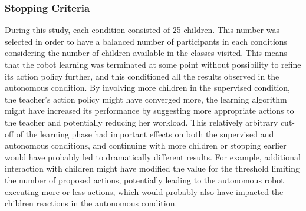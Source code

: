 
\subsubsection{Stopping Criteria}

During this study, each condition consisted of 25 children. This number was selected in order to have a balanced number of participants in each conditions considering the number of  children available in the classes visited. This means that the robot learning was terminated at some point without possibility to refine its action policy further, and this conditioned all the results observed in the autonomous condition. By involving more children in the supervised condition, the teacher's action policy might have converged more, the learning algorithm might have increased its performance by suggesting more appropriate actions to the teacher and potentially reducing her workload. This relatively arbitrary cut-off of the learning phase had important effects on both the supervised and autonomous conditions, and continuing with more children or stopping earlier would have probably led to dramatically different results. For example, additional interaction with children might have modified the value for the threshold limiting the number of proposed actions, potentially leading to the autonomous robot executing more or less actions, which would probably also have impacted the children reactions in the autonomous condition.

